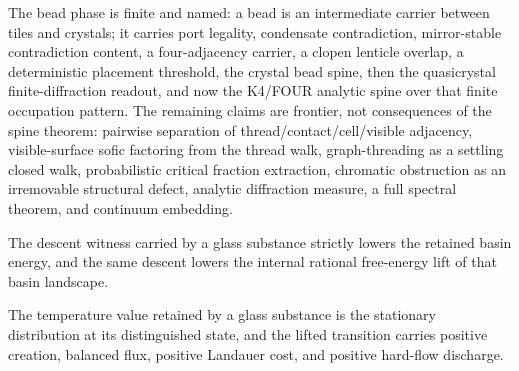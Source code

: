 \begin{proposition}\label{thm:glass-bead-phase-proof-boundary}\leanok{}
The bead phase is finite and named: a bead is an intermediate carrier
between tiles and crystals; it carries port legality, condensate contradiction,
mirror-stable contradiction content, a four-adjacency carrier, a clopen
lenticle overlap, a deterministic placement threshold, the crystal bead spine,
then the quasicrystal finite-diffraction readout, and now the K4/FOUR analytic
spine over that finite occupation pattern.  The remaining claims are frontier,
not consequences of the spine theorem: pairwise separation of
thread/contact/cell/visible adjacency, visible-surface sofic factoring from the
thread walk, graph-threading as a settling closed walk, probabilistic critical
fraction extraction, chromatic obstruction as an irremovable structural defect,
analytic diffraction measure, a full spectral theorem, and continuum embedding.
\end{proposition}

\begin{theorem}\label{thm:glass-substance-descent-lowers-energy}\leanok{}
The descent witness carried by a glass substance strictly lowers the retained
basin energy, and the same descent lowers the internal rational free-energy
lift of that basin landscape.
\end{theorem}

\begin{theorem}\label{thm:glass-substance-temperature}\leanok{}
The temperature value retained by a glass substance is the stationary
distribution at its distinguished state, and the lifted transition carries
positive creation, balanced flux, positive Landauer cost, and positive
hard-flow discharge.
\end{theorem}

